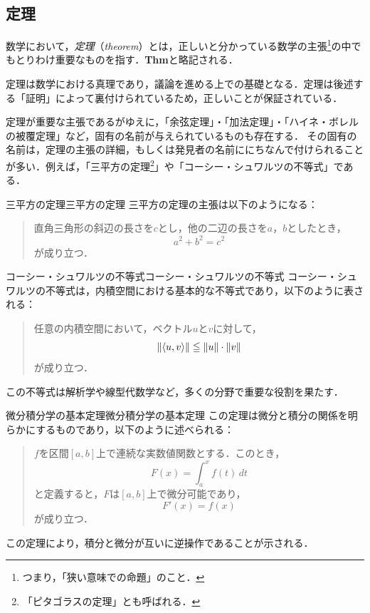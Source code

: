 \subsection{定理}

数学において，\emph{定理}（\emph{theorem}）とは，正しいと分かっている数学の主張\footnote{つまり，「狭い意味での命題」のこと．}の中でもとりわけ重要なものを指す．\textbf{Thm}と略記される．


定理は数学における真理であり，議論を進める上での基礎となる．定理は後述する「証明」によって裏付けられているため，正しいことが保証されている．

定理が重要な主張であるがゆえに，「余弦定理」・「加法定理」・「ハイネ・ボレルの被覆定理」など，固有の名前が与えられているものも存在する．
その固有の名前は，定理の主張の詳細，もしくは発見者の名前ににちなんで付けられることが多い．例えば，「三平方の定理\footnote{「ピタゴラスの定理」とも呼ばれる．}」や「コーシー・シュワルツの不等式」である．

\begin{example}{三平方の定理}{三平方の定理}
  三平方の定理の主張は以下のようになる：
  \begin{quotation}
    直角三角形の斜辺の長さを$c$とし，他の二辺の長さを$a$，$b$としたとき，
    \[
      a^2+b^2=c^2
    \]
    が成り立つ．
  \end{quotation}
\end{example}

\begin{example}{コーシー・シュワルツの不等式}{コーシー・シュワルツの不等式}
  コーシー・シュワルツの不等式は，内積空間における基本的な不等式であり，以下のように表される：
  \begin{quotation}
    任意の内積空間において，ベクトル$u$と$v$に対して，
    \[
      \lVert\langle u, v \rangle\rVert \leqq \lVert u\rVert \cdot \lVert v\rVert
    \]
    が成り立つ．
  \end{quotation}
  この不等式は解析学や線型代数学など，多くの分野で重要な役割を果たす．
\end{example}

\begin{example}{微分積分学の基本定理}{微分積分学の基本定理}
  この定理は微分と積分の関係を明らかにするものであり，以下のように述べられる：
  \begin{quotation}
    $f$を区間$[a, b]$上で連続な実数値関数とする．このとき，
    \[
      F(x) = \int_a^x f(t) \, dt
    \]
    と定義すると，$F$は$[a, b]$上で微分可能であり，
    \[
      F'(x) = f(x)
    \]
    が成り立つ．
  \end{quotation}
  この定理により，積分と微分が互いに逆操作であることが示される．
\end{example}
